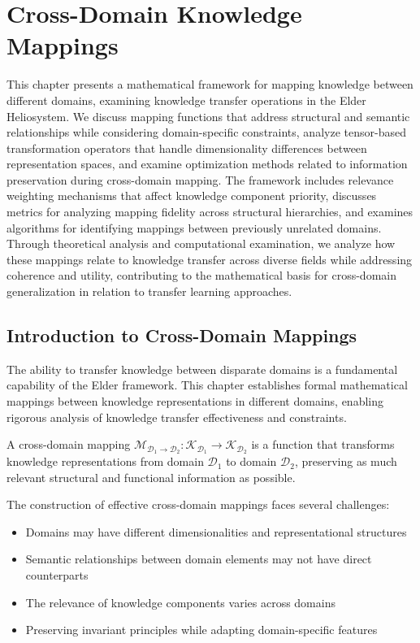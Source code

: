 \chapter{Cross-Domain Knowledge Mappings}

\begin{chapterabstract}
This chapter presents a mathematical framework for mapping knowledge between different domains, examining knowledge transfer operations in the Elder Heliosystem. We discuss mapping functions that address structural and semantic relationships while considering domain-specific constraints, analyze tensor-based transformation operators that handle dimensionality differences between representation spaces, and examine optimization methods related to information preservation during cross-domain mapping. The framework includes relevance weighting mechanisms that affect knowledge component priority, discusses metrics for analyzing mapping fidelity across structural hierarchies, and examines algorithms for identifying mappings between previously unrelated domains. Through theoretical analysis and computational examination, we analyze how these mappings relate to knowledge transfer across diverse fields while addressing coherence and utility, contributing to the mathematical basis for cross-domain generalization in relation to transfer learning approaches.
\end{chapterabstract}

\section{Introduction to Cross-Domain Mappings}

The ability to transfer knowledge between disparate domains is a fundamental capability of the Elder framework. This chapter establishes formal mathematical mappings between knowledge representations in different domains, enabling rigorous analysis of knowledge transfer effectiveness and constraints.

\begin{definition}
A cross-domain mapping $\mathcal{M}_{\mathcal{D}_1 \rightarrow \mathcal{D}_2}: \mathcal{K}_{\mathcal{D}_1} \rightarrow \mathcal{K}_{\mathcal{D}_2}$ is a function that transforms knowledge representations from domain $\mathcal{D}_1$ to domain $\mathcal{D}_2$, preserving as much relevant structural and functional information as possible.
\end{definition}

The construction of effective cross-domain mappings faces several challenges:
\begin{itemize}
    \item Domains may have different dimensionalities and representational structures
    \item Semantic relationships between domain elements may not have direct counterparts
    \item The relevance of knowledge components varies across domains
    \item Preserving invariant principles while adapting domain-specific features
\end{itemize}

